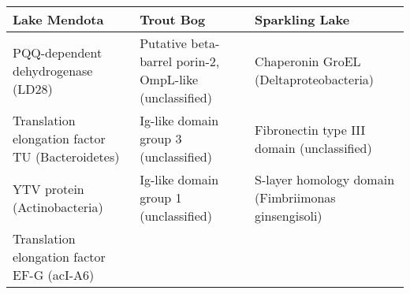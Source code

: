 \documentclass[]{article}
\begin{document}
\begin{longtable}[]{@{}lll@{}}
\toprule
\begin{minipage}[b]{0.24\columnwidth}\raggedright\strut
Lake Mendota\strut
\end{minipage} & \begin{minipage}[b]{0.33\columnwidth}\raggedright\strut
Trout Bog\strut
\end{minipage} & \begin{minipage}[b]{0.33\columnwidth}\raggedright\strut
Sparkling Lake\strut
\end{minipage}\tabularnewline
\midrule
\endhead
\begin{minipage}[t]{0.24\columnwidth}\raggedright\strut
PQQ-dependent dehydrogenase (LD28)\strut
\end{minipage} & \begin{minipage}[t]{0.33\columnwidth}\raggedright\strut
Putative beta-barrel porin-2, OmpL-like (unclassified)\strut
\end{minipage} & \begin{minipage}[t]{0.33\columnwidth}\raggedright\strut
Chaperonin GroEL (Deltaproteobacteria)\strut
\end{minipage}\tabularnewline
\begin{minipage}[t]{0.24\columnwidth}\raggedright\strut
Translation elongation factor TU (Bacteroidetes)\strut
\end{minipage} & \begin{minipage}[t]{0.33\columnwidth}\raggedright\strut
Ig-like domain group 3 (unclassified)\strut
\end{minipage} & \begin{minipage}[t]{0.33\columnwidth}\raggedright\strut
Fibronectin type III domain (unclassified)\strut
\end{minipage}\tabularnewline
\begin{minipage}[t]{0.24\columnwidth}\raggedright\strut
YTV protein (Actinobacteria)\strut
\end{minipage} & \begin{minipage}[t]{0.33\columnwidth}\raggedright\strut
Ig-like domain group 1 (unclassified)\strut
\end{minipage} & \begin{minipage}[t]{0.33\columnwidth}\raggedright\strut
S-layer homology domain (Fimbriimonas ginsengisoli)\strut
\end{minipage}\tabularnewline
\begin{minipage}[t]{0.24\columnwidth}\raggedright\strut
Translation elongation factor EF-G (acI-A6)\strut

\end{minipage}
\end{longtable}
\end{document}
